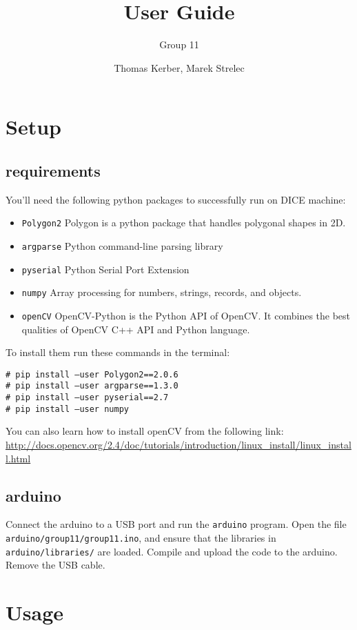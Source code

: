 \documentclass[a4paper,12pt]{scrartcl}
\author{Thomas Kerber, Marek Strelec}
\title{User Guide}
\subtitle{Group 11}
\newcommand{\shellcmd}[1]{\indent\indent\texttt{\footnotesize\# #1}}
\begin{document}
\maketitle
\section{Setup}
\subsection{requirements}
You'll need the following python packages to successfully run on DICE machine:

\begin{itemize}
\item \texttt{Polygon2} Polygon is a python package that handles polygonal shapes in 2D. 
\item \texttt{argparse} Python command-line parsing library
\item \texttt{pyserial} Python Serial Port Extension
\item \texttt{numpy} Array processing for numbers, strings, records, and objects.
\item \texttt{openCV} OpenCV-Python is the Python API of OpenCV. It combines the best qualities of OpenCV C++ API and Python language.
\end{itemize}

To install them run these commands in the terminal:

\shellcmd{pip install --user Polygon2==2.0.6} \\
\shellcmd{pip install --user argparse==1.3.0} \\
\shellcmd{pip install --user pyserial==2.7} \\
\shellcmd{pip install --user numpy}  

You can also learn how to install openCV from the following link:
\url{http://docs.opencv.org/2.4/doc/tutorials/introduction/linux_install/linux_install.html}

\subsection{arduino}
Connect the arduino to a USB port and run the \texttt{arduino} program. Open the file \verb$arduino/group11/group11.ino$, and ensure that the libraries in
\verb$arduino/libraries/$ are loaded. Compile and upload the code to the
arduino. Remove the USB cable.


\section{Usage}
\end{document}
